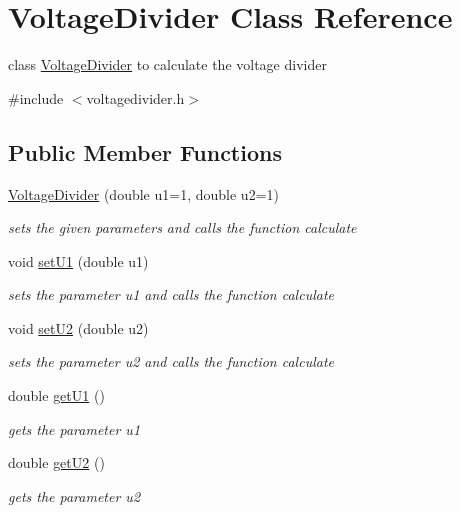 \hypertarget{classVoltageDivider}{}\section{Voltage\+Divider Class Reference}
\label{classVoltageDivider}


class \hyperlink{classVoltageDivider}{Voltage\+Divider} to calculate the voltage divider  




{\ttfamily \#include $<$voltagedivider.\+h$>$}

\subsection*{Public Member Functions}
\begin{DoxyCompactItemize}
\item 
\hyperlink{classVoltageDivider_a7e71609cdfe3faa54ddfde5c7634a92c}{Voltage\+Divider} (double u1=1, double u2=1)
\begin{DoxyCompactList}\small\item\em sets the given parameters and calls the function calculate \end{DoxyCompactList}\item 
void \hyperlink{classVoltageDivider_aecff4be4ac8dbe9dbee07f57a15cc370}{set\+U1} (double u1)
\begin{DoxyCompactList}\small\item\em sets the parameter u1 and calls the function calculate \end{DoxyCompactList}\item 
void \hyperlink{classVoltageDivider_a52270fd71980ed94bc64e7a6f65a9e5c}{set\+U2} (double u2)
\begin{DoxyCompactList}\small\item\em sets the parameter u2 and calls the function calculate \end{DoxyCompactList}\item 
double \hyperlink{classVoltageDivider_a36ab249dd0f1e5cb7b055affd249af6c}{get\+U1} ()
\begin{DoxyCompactList}\small\item\em gets the parameter u1 \end{DoxyCompactList}\item 
double \hyperlink{classVoltageDivider_aee0957fabf473c72488e3d5fa7316bcd}{get\+U2} ()
\begin{DoxyCompactList}\small\item\em gets the parameter u2 \end{DoxyCompactList}\item 

\end{DoxyCompactItemize}
